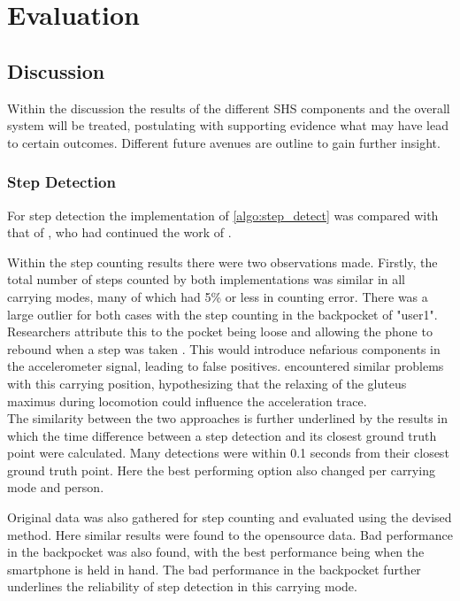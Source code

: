\chapter{Evaluation}

\section{Discussion}
Within the discussion the results of the different \ac{SHS} components and the overall system will be treated, postulating with supporting evidence what may have lead to certain outcomes. Different future avenues are outline to gain further insight.

\subsection*{Step Detection}
For step detection the implementation of \cref{algo:step_detect} was compared with that of \citet{Salvi2018}, who had continued the work of \cite{Harle2013}.  \par 
Within the step counting results there were two observations made. Firstly, the total number of steps counted by both implementations was similar in all carrying modes, many of which had 5\% or less in counting error. There was a large outlier for both cases with the step counting in the backpocket of "user1". Researchers attribute this to the pocket being loose and allowing the phone to rebound when a step was taken \cite{Salvi2018}. This would introduce nefarious components in the accelerometer signal, leading to false positives. \citet{Brajdic2013} encountered similar problems with this carrying position, hypothesizing that the relaxing of the gluteus maximus during locomotion could influence the acceleration trace.\\
The similarity between the two approaches is further underlined by the results in which the time difference between a step detection and its closest ground truth point were calculated. Many detections were within 0.1 seconds from their closest ground truth point. Here the best performing option also changed per carrying mode and person.\par 
Original data was also gathered for step counting and evaluated using the devised method. Here similar results were found to the opensource data. Bad performance in the backpocket was also found, with the best performance being when the smartphone is held in hand. The bad performance in the backpocket further underlines the reliability of step detection in this carrying mode. \par  
